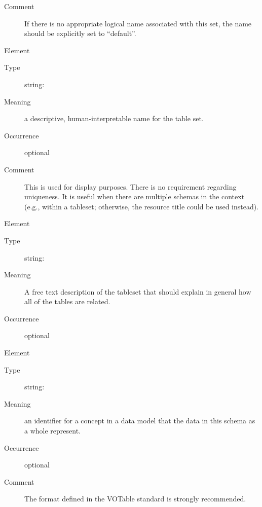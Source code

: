 \documentclass[11pt,a4paper]{ivoa}
\begin{document}
\begin{generated}
\begin{bigdescription}
\begin{description}
\item[Comment] 
               If there is no appropriate logical name associated with
               this set, the name should be explicitly set to
               “default”.  
             

\end{description}
\item[Element \xmlel{title}]
\begin{description}
\item[Type] string: 
\item[Meaning] 
                  a descriptive, human-interpretable name for the table set.
               
\item[Occurrence] optional
\item[Comment] 
                  This is used for display purposes.  There is no requirement
                  regarding uniqueness.  It is useful when there are
                  multiple schemas in the context (e.g., within a
                  tableset; otherwise, the resource title could be
                  used instead).
               

\end{description}
\item[Element \xmlel{description}]
\begin{description}
\item[Type] string: 
\item[Meaning] 
               A free text description of the tableset that should
               explain in general how all of the tables are related.
             
\item[Occurrence] optional

\end{description}
\item[Element \xmlel{utype}]
\begin{description}
\item[Type] string: 
\item[Meaning] 
                  an identifier for a concept in a data model that
                  the data in this schema as a whole represent.  
               
\item[Occurrence] optional
\item[Comment] 
                  The format defined in the VOTable standard is strongly
                  recommended. 
               


\end{description}
\end{bigdescription}
\end{generated}
\end{document}

